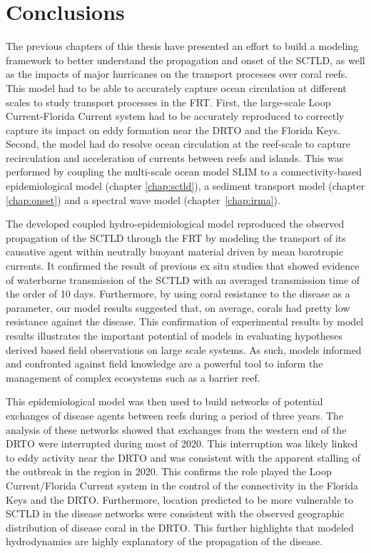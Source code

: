 \section{Conclusions}
The previous chapters of this thesis have presented an effort to build a modeling framework to better understand the propagation and onset of the SCTLD, as well as the impacts of major hurricanes on the transport processes over coral reefs. This model had to be able to accurately capture ocean circulation at different scales to study transport processes in the FRT. First, the large-scale Loop Current-Florida Current system had to be accurately reproduced to correctly capture its impact on eddy formation near the DRTO and the Florida Keys. Second, the model had do resolve ocean circulation at the reef-scale to capture recirculation and acceleration of currents between reefs and islands. This was performed by coupling the multi-scale ocean model SLIM to a connectivity-based epidemiological model (chapter \ref{chap:sctld}), a sediment transport model (chapter \ref{chap:onset}) and a spectral wave model (chapter~\ref{chap:irma}).

The developed coupled hydro-epidemiological model reproduced the observed propagation of the SCTLD through the FRT by modeling the transport of its causative agent within neutrally buoyant material driven by mean barotropic currents. It confirmed the result of previous ex situ studies that showed evidence of waterborne transmission of the SCTLD with an averaged transmission time of the order of 10 days. Furthermore, by using coral resistance to the disease as a parameter, our model results suggested that, on average, corals had pretty low resistance against the disease. This confirmation of experimental results by model results illustrates the important potential of models in evaluating hypotheses derived based field observations on large scale systems. As such, models informed and confronted against field knowledge are a powerful tool to inform the management of complex ecosystems such as a barrier reef.

This epidemiological model was then used to build networks of potential exchanges of disease agents between reefs during a period of three years. The analysis of these networks showed that exchanges from the western end of the DRTO were interrupted during most of 2020. This interruption was likely linked to eddy activity near the DRTO and was consistent with the apparent stalling of the outbreak in the region in 2020. This confirms the role played the Loop Current/Florida Current system in the control of the connectivity in the Florida Keys and the DRTO. Furthermore, location predicted to be more vulnerable to SCTLD in the disease networks were consistent with the observed geographic distribution of disease coral in the DRTO. This further highlights that modeled hydrodynamics are highly explanatory of the propagation of the disease.

